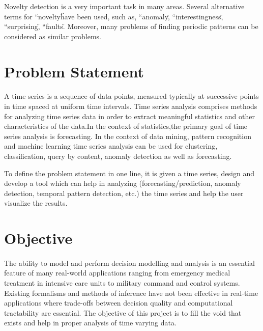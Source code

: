 \documentclass[12pt,a4paper]{report}
\begin{document}
Novelty detection is a very important task in many areas. Several alternative terms for ``novelty\" have been used, such as, ``anomaly\", ``interestingness\", ``surprising\", ``faults\". Moreover, many problems of finding periodic patterns can be considered as similar problems.



\section{Problem Statement}
\paragraph{} A time series is a sequence of data points, measured typically at successive points in time spaced at uniform time intervals. Time series analysis comprises methods for analyzing time series data in order to extract meaningful statistics and other characteristics of the data.In the context of statistics,the primary goal of time series analysis is forecasting. In the context of data mining, pattern recognition and machine learning time series analysis can be used for clustering, classification, query by content, anomaly detection as well as forecasting.

To define the problem statement in one line, it is given a time series, design and develop a tool which can help in analyzing (forecasting/prediction, anomaly detection, temporal pattern detection, etc.) the time series and help the user visualize the results. 

\section{Objective}
\paragraph{} The ability to model and perform decision modelling and analysis is an essential feature of many real-world applications ranging from emergency medical treatment in intensive care units to military command and control systems. Existing formalisms and methods of inference have not been effective in real-time applications where trade-offs between decision quality and computational tractability are essential. The objective of this project is to fill the void that exists and help in proper analysis of time varying data.
\end{document}
